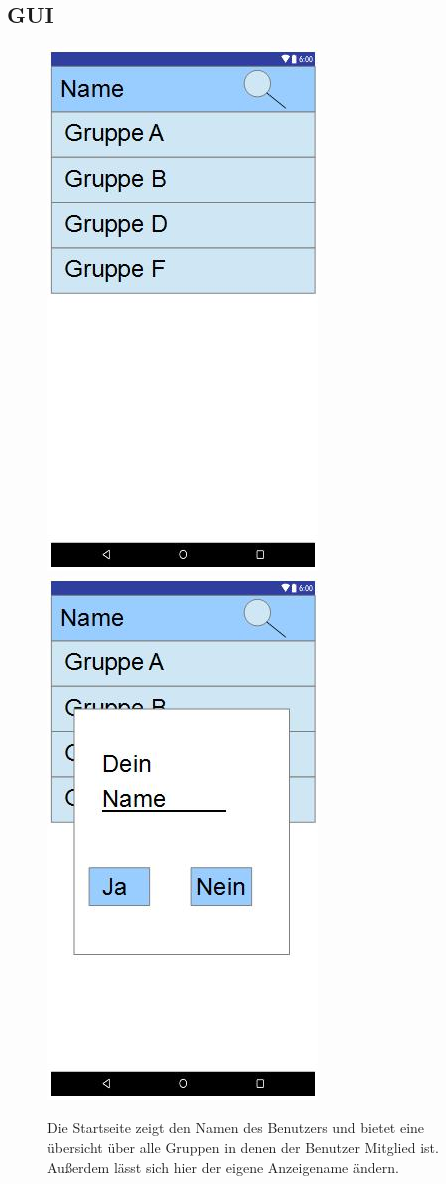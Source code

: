 \documentclass{scrartcl}
\begin{document}
	\newpage

	\subsection{GUI}
	\begin{figure}[h]
	\includegraphics[width=.5\textwidth]{GUI_Start.jpg}
	\includegraphics[width=.5\textwidth]{GUI_changeName.jpg}
	\caption{Die Startseite zeigt den Namen des Benutzers und bietet eine übersicht über alle Gruppen in denen der Benutzer Mitglied ist. Außerdem lässt sich hier der eigene Anzeigename ändern.}
 	\end{figure}
\end{document}
